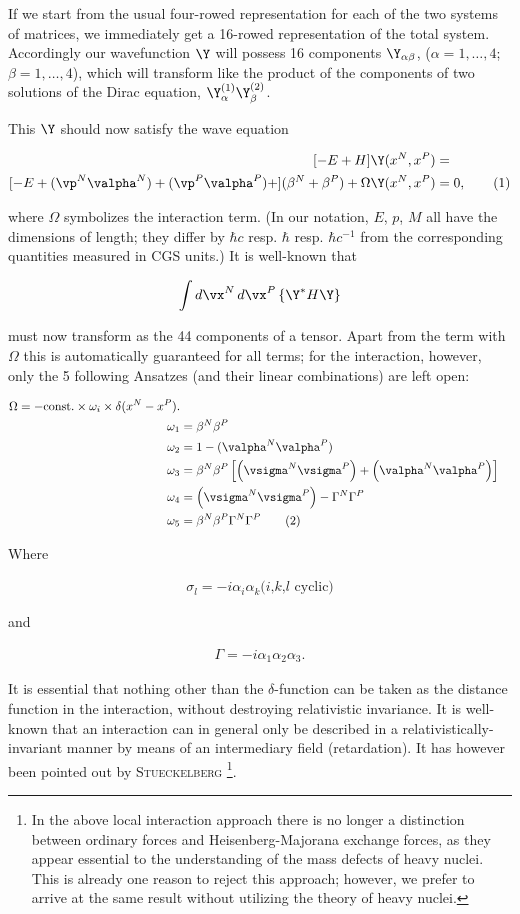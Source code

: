 \documentclass{article}
\newcommand{\nequ}[2]{
\begin{align*}
#1
\tag{#2}
\end{align*}
}
\newcommand{\uequ}[1]{
\begin{align*}
#1
\end{align*}
}
\begin{document}
If we start from the usual four-rowed representation for each of the two systems of matrices, we immediately get a 16-rowed representation of the total system. Accordingly our wavefunction $\Y$ will possess 16 components $\Y_{\alpha\beta}$, ($\alpha=1,\dots,4$; $\beta=1,\dots,4$), which will transform like the product of the components of two solutions of the Dirac equation, $\Y^{(1)}_\alpha \Y^{(2)}_\beta$.

This $\Y$ should now satisfy the wave equation
\nequ{
[-E + H]\Y(x^N, x^P) &= \\
[-E + (\vp^N \valpha^N) + (\vp^P \valpha^P) + ](\beta^N + \beta^P) + \Omega
\Y(x^N,x^P) &= 0,}{1}
where $\Omega$ symbolizes the interaction term. (In our notation, $E$, $p$, $M$ all have the dimensions of length; they differ by $\hbar c$ resp. $\hbar$ resp. $\hbar c^{-1}$ from the corresponding quantities measured in CGS units.) It is well-known that
\uequ{
\int{{d\vx^N}\,{d\vx^P}\left\{\Y^* H \Y\right\}}
}
must now transform as the 44 components of a tensor. Apart from the term with $\Omega$ this is automatically guaranteed for all terms; for the interaction, however, only the 5 following Ansatzes (and their linear combinations) are left open\cite{3}:
\nequ{
\Omega = -\text{const.}\times\omega_i \times \delta(x^N - x^P).\\
\omega_1 &= \beta^N \beta^P\\
\omega_2 &= 1 - (\valpha^N \valpha^P)\\
\omega_3 &= \beta^N \beta^P\left[
            \left(\vsigma^N \vsigma^P\right) + \left(\valpha^N \valpha^P\right)\right]\\
\omega_4 &= \left(\vsigma^N \vsigma^P \right) - \Gamma^N \Gamma^P\\
\omega_5 &= \beta^N \beta^P \Gamma^N \Gamma^P
}{2}

Where
\uequ{
\sigma_l = -i\alpha_i \alpha_k \text{($i$,$k$,$l$ cyclic)}
}
and
\uequ{
\Gamma = -i\alpha_1 \alpha_2 \alpha_3.
}

It is essential that nothing other than the $\delta$-function can be taken as the distance function in the interaction, without destroying relativistic invariance. It is well-known that an interaction can in general only be described in a relativistically-invariant manner by means of an intermediary field (retardation). It has however been pointed out by \textsc{Stueckelberg}\cite{4} \footnote{In the above local interaction approach there is no longer a distinction between ordinary forces and Heisenberg-Majorana exchange forces, as they appear essential to the understanding of the mass defects of heavy nuclei. This is already one reason to reject this approach; however, we prefer to arrive at the same result without utilizing the theory of heavy nuclei.}.
\end{document}
